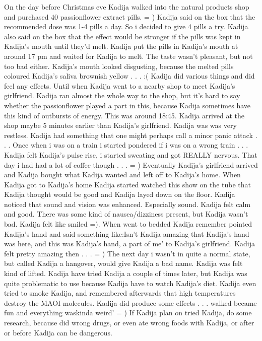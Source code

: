 \documentclass[12pt]{book}
\begin{document}
On the day before Christmas eve Kadija walked into the natural products shop and purchased 40 passionflower extract pills. = ) Kadija said on the box that the recommended dose was 1-4 pills a day. So i decided to give 4 pills a try. Kadija also said on the box that the effect would be stronger if the pills was kept in Kadija's mouth until they'd melt. Kadija put the pills in Kadija's mouth at around 17 pm and waited for Kadija to melt. The taste wasn't pleasant, but not too bad either. Kadija's mouth looked disgusting, because the melted pills coloured Kadija's saliva brownish yellow . . .  :( Kadija did various things and did feel any effects. Until when Kadija went to a nearby shop to meet Kadija's girlfriend. Kadija ran almost the whole way to the shop, but it's hard to say whether the passionflower played a part in this, because Kadija sometimes have this kind of outbursts of energy. This was around 18:45. Kadija arrived at the shop maybe 5 minutes earlier than Kadija's girlfriend. Kadija was was very restless. Kadija had something that one might perhaps call a minor panic attack . . .  Once when i was on a train i started pondered if i was on a wrong train . . .  Kadija felt Kadija's pulse rise, i started sweating and got REALLY nervous. That day i had had a lot of coffee though . . .  = ) Eventually Kadija's girlfriend arrived and Kadija bought what Kadija wanted and left off to Kadija's home. When Kadija got to Kadija's home Kadija started watched this show on the tube that Kadija thought would be good and Kadija layed down on the floor. Kadija noticed that sound and vision was enhanced. Especially sound. Kadija felt calm and good. There was some kind of nausea/dizziness present, but Kadija wasn't bad. Kadija felt like smiled =). When went to bedded Kadija remember pointed Kadija's hand and said something like:Isn't Kadija amazing that Kadija's hand was here, and this was Kadija's hand, a part of me' to Kadija's girlfriend. Kadija felt pretty amazing then . . .  = ) The next day i wasn't in quite a normal state, but called Kadija a hangover, would give Kadija a bad name. Kadija was felt kind of lifted. Kadija have tried Kadija a couple of times later, but Kadija was quite problematic to use because Kadija have to watch Kadija's diet. Kadija even tried to smoke Kadija, and remembered afterwards that high temperatures destroy the MAOI molecules. Kadija did produce some effects . . .  walked became fun and everything waskinda weird' = ) If Kadija plan on tried Kadija, do some research, because did wrong drugs, or even ate wrong foods with Kadija, or after or before Kadija can be dangerous.
\end{document}
